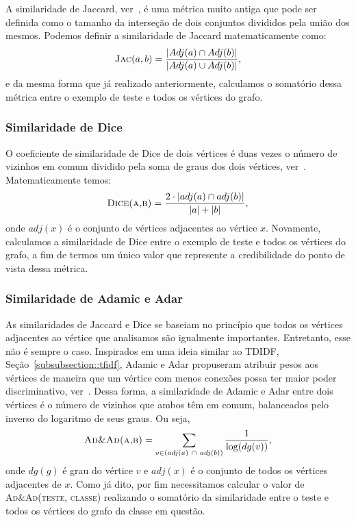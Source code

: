 A similaridade de Jaccard, ver~\cite{Jaccard01}, é uma métrica muito antiga que pode ser definida como o tamanho da interseção de dois conjuntos divididos pela união dos mesmos. Podemos definir a similaridade de Jaccard matematicamente como:
\begin{equation}
\textsc{Jac}(a, b) =  \frac{|Adj(a) \cap Adj(b)|}{|Adj(a) \cup Adj(b)|},
\end{equation}
e da mesma forma que já realizado anteriormente, calculamos o somatório dessa métrica entre o exemplo de teste e todos os vértices do grafo.


\subsubsection{Similaridade de Dice}
\label{subsubsection::dice}

O coeficiente de similaridade de Dice de dois vértices é duas vezes o número de vizinhos em comum dividido pela soma de graus dos dois vértices, ver~\cite{Dice45}. Matematicamente temos:
\begin{equation}
\textsc{Dice(a,b)} = \frac{2 \cdot | adj(a) \cap adj(b) | }{| a | + | b |},
\end{equation}
onde $adj(x)$ é o conjunto de vértices adjacentes ao vértice $x$. Novamente, calculamos a similaridade de Dice entre o exemplo de teste e todos os vértices do grafo, a fim de termos um único valor que represente a credibilidade do ponto de vista dessa métrica.

\subsubsection{ Similaridade de Adamic e Adar}
\label{subsubsection::inverselog}

As similaridades de Jaccard e Dice se baseiam no princípio que todos os vértices adjacentes ao vértice que analisamos são igualmente importantes. Entretanto, esse não é sempre o caso.
Inspirados em uma ideia similar ao TDIDF, Seção~\ref{subsubsection::tfidf}, Adamic e Adar propuseram atribuir pesos aos vértices de maneira que um vértice com menos conexões possa ter maior poder discriminativo, ver~\cite{Adamic03}. Dessa forma, a similaridade de Adamic e Adar entre dois vértices é o número de vizinhos que ambos têm em comum, balanceados pelo inverso do logaritmo de seus graus. Ou seja,
\begin{equation}
\textsc{Ad\&Ad(a,b)} =  \sum\limits_{v \in (adj(a)\ \cap\ adj(b))} \frac{1}{ \log(dg(v))},
\end{equation}
onde $dg(g)$ é grau do vértice $v$ e $adj(x)$ é o conjunto de todos os vértices adjacentes de $x$. Como já dito, por fim necessitamos calcular o valor de \textsc{Ad\&Ad(teste, classe)} realizando o somatório da similaridade entre o teste e todos os vértices do grafo da classe em questão.





